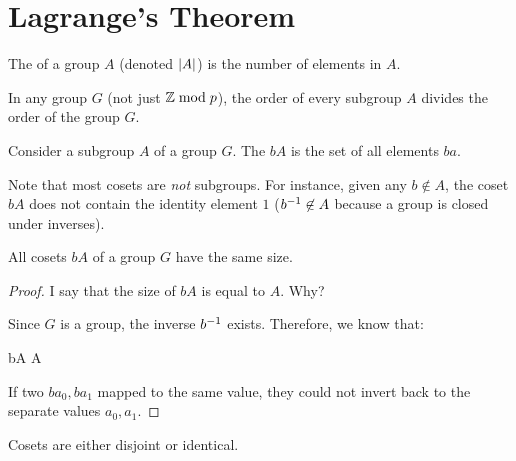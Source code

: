 \section{Lagrange's Theorem}

\begin{definition}
  The  of a group $A$ (denoted $|A|$) is the number
  of elements in $A$.
\end{definition}

\begin{theorem}
  In any group $G$ (not just $\mathbb{Z} \bmod p$), the order of every subgroup
  $A$ divides the order of the group $G$.
\end{theorem}

\begin{definition}
  Consider a subgroup $A$ of a group $G$. The  $bA$ is
  the set of all elements $ba$.

  Note that most cosets are \emph{not} subgroups. For instance, given
  any $b \not\in A$, the coset $bA$ does not contain the identity
  element $1$ (${b}^{-1} \not\in A$ because a group is closed under
  inverses).
\end{definition}

\begin{lemma}
  All cosets $bA$ of a group $G$ have the same size.
\end{lemma}

\begin{proof}
  I say that the size of $bA$ is equal to $A$. Why?

  Since $G$ is a group, the inverse ${b}^{-1}$ exists. Therefore, we know
  that:

  \begin{nedqn}
     bA
  \eqcol
    A
  \end{nedqn}

  If two $b a_0, b a_1$ mapped to the same value, they could not invert
  back to the separate values $a_0, a_1$.
\end{proof}

\begin{lemma}
  Cosets are either disjoint or identical.
\end{lemma}

